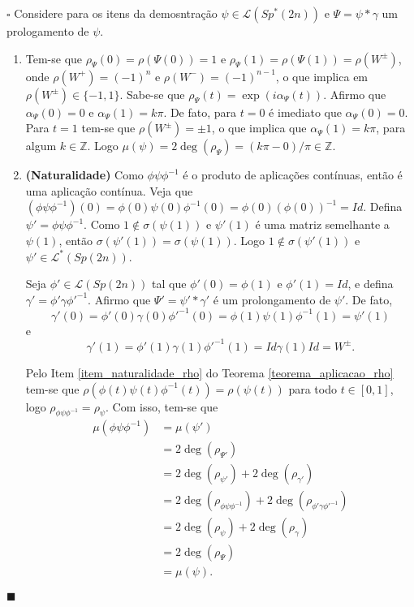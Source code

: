 \documentclass[12pt]{book}
\newenvironment{prova}[1]{$\square$ #1}{\hfill$\blacksquare$}
\newcommand{\caminhosespeciais}[1]{\mathcal{L}^{*}(#1)}
\newcommand{\caminhos}{\mathcal{L}}
\newcommand{\espectrooperador}[1]{\sigma(#1)}
\newcommand{\gruposimpletico}[1]{Sp(#1)}
\newcommand{\gruposimpleticonaodegenerado}[1]{Sp^{#1}(2n)}
\newcommand{\inteiros}{\mathbb{Z}}
\newcommand{\intervalo}{[0,1]}
\begin{document}
	\begin{prova}
		
		Considere para os itens da demosntração $\psi \in \caminhos{(\gruposimpleticonaodegenerado{*})}$ e $\Psi=\psi * \gamma$ um prologamento de $\psi$.
		\begin{enumerate}
			\item Tem-se que $\rho_{\Psi}(0) = \rho(\Psi(0)) = 1$ e $\rho_{\Psi}(1) = \rho(\Psi(1)) = \rho(W^{\pm})$, onde $\rho(W^{+})=(-1)^{n}$ e $\rho(W^{-})=(-1)^{n-1}$, o que implica em $\rho(W^{\pm}) \in \{ -1,1\}$. Sabe-se que $\rho_{\Psi}(t) = \exp(i\alpha_{\Psi}(t))$. Afirmo que $\alpha_{\Psi}(0)=0$ e $\alpha_{\Psi}(1)=k\pi$. De fato, para $t=0$ é imediato que $\alpha_{\Psi}(0)=0$. Para $t=1$ tem-se que $\rho(W^{\pm}) = \pm 1$, o que implica que $\alpha_{\Psi}(1) = k\pi$, para algum $k\in \inteiros$. Logo $\mu(\psi) = 2\deg(\rho_{\Psi}) = (k\pi-0)/\pi \in \inteiros$.
			
			\item \textbf{(Naturalidade)}
			Como $\phi\psi\phi^{-1}$ é o produto de aplicações contínuas, então é uma aplicação contínua. Veja que $(\phi\psi\phi^{-1})(0) = \phi(0)\psi(0)\phi^{-1}(0) = \phi(0)(\phi(0))^{-1} = Id$. Defina $\psi'=\phi\psi\phi^{-1}$. Como $1\notin \espectrooperador{\psi(1)}$ e $\psi'(1)$ é uma matriz semelhante a $\psi(1)$, então $\espectrooperador{\psi'(1)}=\espectrooperador{\psi(1)}$. Logo $1\notin \espectrooperador{\psi'(1)}$ e $\psi'\in \caminhosespeciais{\gruposimpletico{2n}}$.
			
			Seja $\phi'\in \caminhos(\gruposimpletico{2n})$ tal que $\phi'(0) = \phi(1)$ e $\phi'(1) = Id$, e defina $\gamma'=\phi'\gamma\phi'^{-1}$. Afirmo que $\Psi'=\psi'*\gamma'$ é um prolongamento de $\psi'$. De fato, 
			$$
			\gamma'(0)=\phi'(0)\gamma(0)\phi'^{-1}(0) = \phi(1)\psi(1)\phi^{-1}(1) = \psi'(1)
			$$ 
			e 
			$$
			\gamma'(1)=\phi'(1)\gamma(1)\phi'^{-1}(1) = Id\gamma(1)Id = W^{\pm}.
			$$
			
			Pelo Item \ref{item_naturalidade_rho} do Teorema \ref{teorema_aplicacao_rho} tem-se que  $\rho(\phi(t)\psi(t)\phi^{-1}(t)) = \rho(\psi(t))$ para todo $t\in \intervalo$, logo $\rho_{\phi\psi\phi^{-1}} = \rho_{\psi}$. Com isso, tem-se que 
			$$
			\begin{aligned}
			\mu(\phi\psi\phi^{-1})
			&=\mu(\psi')
			\\
			&= 2\deg(\rho_{\Psi'})
			\\
			&= 2\deg(\rho_{\psi'}) + 2\deg(\rho_{\gamma'})
			\\
			&=2\deg(\rho_{\phi\psi\phi^{-1}}) + 2\deg(\rho_{\phi'\gamma\phi'^{-1}})
			\\
			&=2\deg(\rho_{\psi}) + 2\deg(\rho_{\gamma})
			\\
			&=2\deg(\rho_{\Psi})
			\\
			&= \mu(\psi).			
			\end{aligned}
			$$
			

\end{enumerate}
\end{prova}
\end{document}

